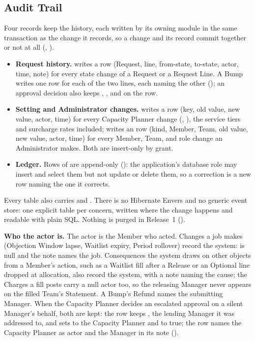 \subsection{Audit Trail}

Four records keep the history, each written by its owning module in the same transaction as the change it records, so a change and its record commit together or not at all (, ).

\begin{itemize}
  \item \textbf{Request history.}  writes a  row (Request, line, from-state, to-state, actor, time, note) for every state change of a Request or a Request Line. A Bump writes one row for each of the two lines, each naming the other (); an approval decision also keeps , , and  on the  row.
  \item \textbf{Setting and Administrator changes.}  writes a  row (key, old value, new value, actor, time) for every Capacity Planner change (, ), the service tiers and surcharge rates included;  writes an  row (kind, Member, Team, old value, new value, actor, time) for every Member, Team, and role change an Administrator makes. Both are insert-only by grant.
  \item \textbf{Ledger.} Rows of  are append-only (): the application's database role may insert and select them but not update or delete them, so a correction is a new row naming the one it corrects.
\end{itemize}

Every table also carries  and . There is no Hibernate Envers and no generic event store: one explicit table per concern, written where the change happens and readable with plain SQL. Nothing is purged in Release~1 ().

\textbf{Who the actor is.} The actor is the Member who acted. Changes a job makes (Objection Window lapse, Waitlist expiry, Period rollover) record the system:  is null and the note names the job. Consequences the system draws on other objects from a Member's action, such as a Waitlist fill after a Release or an Optional line dropped at allocation, also record the system, with a note naming the cause; the Charges a fill posts carry a null actor too, so the releasing Manager never appears on the filled Team's Statement. A Bump's Refund names the submitting Manager. When the Capacity Planner decides an escalated approval on a silent Manager's behalf, both are kept: the  row keeps , the lending Manager it was addressed to, and sets  to the Capacity Planner and  to true; the  row names the Capacity Planner as actor and the Manager in its note ().

